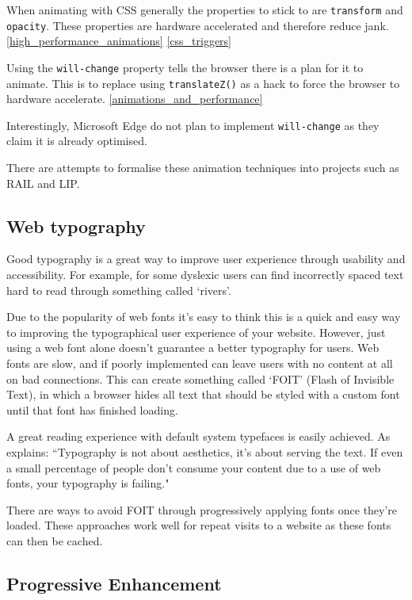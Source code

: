 When animating with CSS generally the properties to stick to are \verb|transform| and \verb|opacity|. These properties are hardware accelerated and therefore reduce jank. \ref{high_performance_animations} \ref{css_triggers}

Using the \verb|will-change| property tells the browser there is a plan for it to animate. This is to replace using \verb|translateZ()| as a hack to force the browser to hardware accelerate. \ref{animations_and_performance}

Interestingly, Microsoft Edge do not plan to implement \verb|will-change| as they claim it is already optimised. \cite{will_change_edge}

There are attempts to formalise these animation techniques into projects such as RAIL and LIP. \cite{introducing_RAIL} \cite{FLIP}

\subsection{Web typography} \label{l-r--web-type}

Good typography is a great way to improve user experience through usability and accessibility. For example, for some dyslexic users can find incorrectly spaced text hard to read through something called `rivers'. \cite{dyslexia}

Due to the popularity of web fonts it's easy to think this is a quick and easy way to improving the typographical user experience of your website. However, just using a web font alone doesn't guarantee a better typography for users. Web fonts are slow, and if poorly implemented can leave users with no content at all on bad connections. This can create something called `FOIT' (Flash of Invisible Text), in which a browser hides all text that should be styled with a custom font until that font has finished loading. \cite{FOIT}

A great reading experience with default system typefaces is easily achieved. As \cite{against_webfonts} explains: ``Typography is not about aesthetics, it's about serving the text. If even a small percentage of people don't consume your content due to a use of web fonts, your typography is failing."

There are ways to avoid FOIT through progressively applying fonts once they're loaded. These approaches work well for repeat visits to a website as these fonts can then be cached. \cite{FOIT}

\subsection{Progressive Enhancement} \label{l-r--progressive-enhancement}

